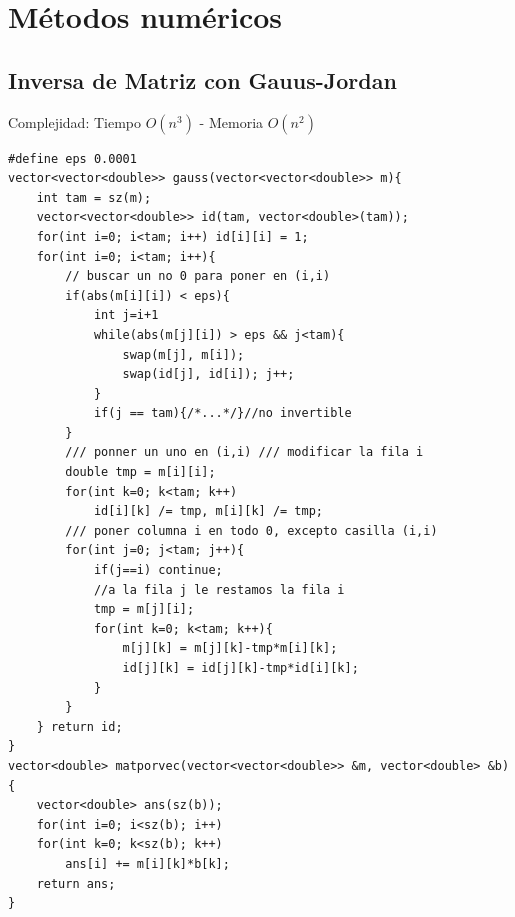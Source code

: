 \section{Métodos numéricos}
\subsection{Inversa de Matriz con Gauus-Jordan}
Complejidad: Tiempo $O\left(n^3\right)$ - Memoria $O\left(n^2\right)$
\begin{verbatim}
#define eps 0.0001
vector<vector<double>> gauss(vector<vector<double>> m){
    int tam = sz(m);
    vector<vector<double>> id(tam, vector<double>(tam));
    for(int i=0; i<tam; i++) id[i][i] = 1;
    for(int i=0; i<tam; i++){
        // buscar un no 0 para poner en (i,i)
        if(abs(m[i][i]) < eps){
            int j=i+1
            while(abs(m[j][i]) > eps && j<tam){
                swap(m[j], m[i]);
                swap(id[j], id[i]); j++;
            }
            if(j == tam){/*...*/}//no invertible
        }
        /// ponner un uno en (i,i) /// modificar la fila i
        double tmp = m[i][i];
        for(int k=0; k<tam; k++)
            id[i][k] /= tmp, m[i][k] /= tmp;
        /// poner columna i en todo 0, excepto casilla (i,i)
        for(int j=0; j<tam; j++){
            if(j==i) continue;
            //a la fila j le restamos la fila i
            tmp = m[j][i];
            for(int k=0; k<tam; k++){
                m[j][k] = m[j][k]-tmp*m[i][k];
                id[j][k] = id[j][k]-tmp*id[i][k];
            }
        }
    } return id;
}
vector<double> matporvec(vector<vector<double>> &m, vector<double> &b){
    vector<double> ans(sz(b));
    for(int i=0; i<sz(b); i++)
    for(int k=0; k<sz(b); k++)
        ans[i] += m[i][k]*b[k];
    return ans;
}
\end{verbatim}



